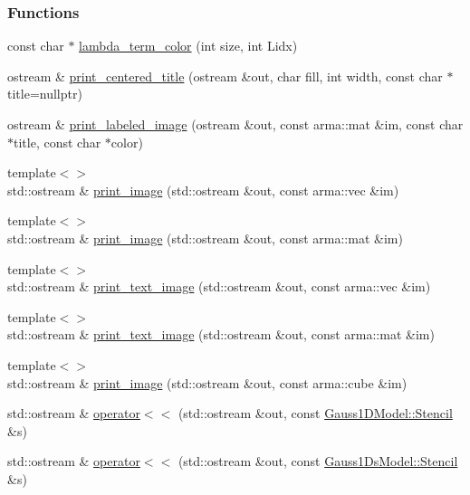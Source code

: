 \subsubsection*{Functions}
\begin{DoxyCompactItemize}
\item 
const char $\ast$ \hyperlink{namespacemappel_a04656452adb7884e197a68ee4c642f6b}{lambda\+\_\+term\+\_\+color} (int size, int Lidx)
\item 
ostream \& \hyperlink{namespacemappel_a88fc8fe46dcf69cc0e0861d2f6f28a4e}{print\+\_\+centered\+\_\+title} (ostream \&out, char fill, int width, const char $\ast$title=nullptr)
\item 
ostream \& \hyperlink{namespacemappel_ab2dadb64b79f80c01086ce2c3d42e642}{print\+\_\+labeled\+\_\+image} (ostream \&out, const arma\+::mat \&im, const char $\ast$title, const char $\ast$color)
\item 
{\footnotesize template$<$$>$ }\\std\+::ostream \& \hyperlink{namespacemappel_a846ffe01da2a5333d847cbb7845861e8}{print\+\_\+image} (std\+::ostream \&out, const arma\+::vec \&im)
\item 
{\footnotesize template$<$$>$ }\\std\+::ostream \& \hyperlink{namespacemappel_ad8730f7a4e2aadfd329c74692ea62504}{print\+\_\+image} (std\+::ostream \&out, const arma\+::mat \&im)
\item 
{\footnotesize template$<$$>$ }\\std\+::ostream \& \hyperlink{namespacemappel_ab76cda908032f732529b5a5ef9af6fe2}{print\+\_\+text\+\_\+image} (std\+::ostream \&out, const arma\+::vec \&im)
\item 
{\footnotesize template$<$$>$ }\\std\+::ostream \& \hyperlink{namespacemappel_aeb4866d8a7ed74d646c235f4c2bcb2ce}{print\+\_\+text\+\_\+image} (std\+::ostream \&out, const arma\+::mat \&im)
\item 
{\footnotesize template$<$$>$ }\\std\+::ostream \& \hyperlink{namespacemappel_a5c439f824ab91a6e426685d74ee90a33}{print\+\_\+image} (std\+::ostream \&out, const arma\+::cube \&im)
\item 
std\+::ostream \& \hyperlink{namespacemappel_ade30cb844a141741b110c52cdc433e69}{operator$<$$<$} (std\+::ostream \&out, const \hyperlink{classmappel_1_1Gauss1DModel_1_1Stencil}{Gauss1\+D\+Model\+::\+Stencil} \&s)
\item 
std\+::ostream \& \hyperlink{namespacemappel_a22c37b5ca505385ebe722a7bc3e2d874}{operator$<$$<$} (std\+::ostream \&out, const \hyperlink{classmappel_1_1Gauss1DsModel_1_1Stencil}{Gauss1\+Ds\+Model\+::\+Stencil} \&s)

\end{DoxyCompactItemize}
